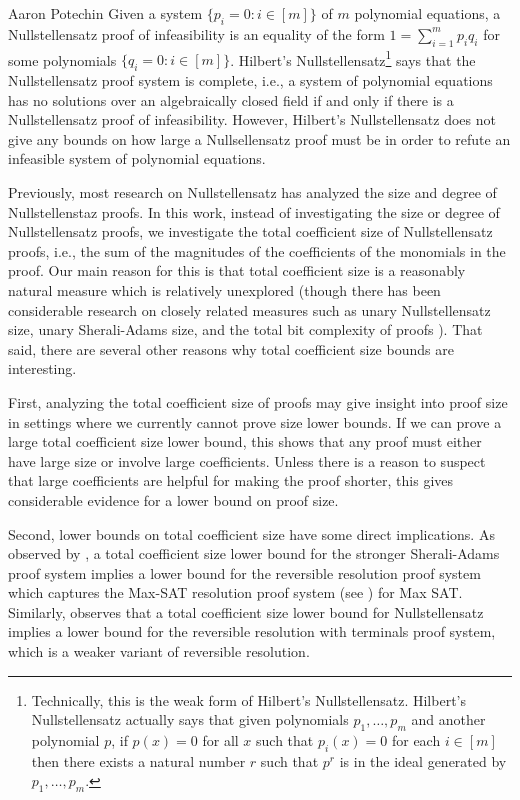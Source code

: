 \documentclass[report]{owrart}
\begin{document}
\begin{report}
\begin{talk}{Aaron Potechin}
    Given a system $\{p_i = 0: i \in [m]\}$ of $m$ polynomial equations, a Nullstellensatz proof of infeasibility is an equality of the form $1 = \sum_{i=1}^{m}{p_i{q_i}}$ for some polynomials $\{q_i = 0: i \in [m]\}$. Hilbert's Nullstellensatz\footnote{Technically, this is the weak form of Hilbert's Nullstellensatz. Hilbert's Nullstellensatz actually says that given polynomials $p_1,\ldots,p_m$ and another polynomial $p$, if $p(x) = 0$ for all $x$ such that $p_i(x) = 0$ for each $i \in [m]$ then there exists a natural number $r$ such that $p^r$ is in the ideal generated by $p_1,\ldots,p_m$. 
} says that the Nullstellensatz proof system is complete, i.e., a system of polynomial equations has no solutions over an algebraically closed field if and only if there is a Nullstellensatz proof of infeasibility. However, Hilbert's Nullstellensatz does not give any bounds on how large a Nullsellensatz proof must be in order to refute an infeasible system of polynomial equations.

Previously, most research on Nullstellensatz has analyzed the size and degree of Nullstellenstaz proofs. In this work, instead of investigating the size or degree of Nullstellensatz proofs, we investigate the total coefficient size of Nullstellensatz proofs, i.e., the sum of the magnitudes of the coefficients of the monomials in the proof. Our main reason for this is that total coefficient size is a reasonably natural measure which is relatively unexplored (though there has been considerable research on closely related measures such as unary Nullstellensatz size, 
unary Sherali-Adams size, and the total bit complexity of proofs \cite{10.4230/LIPIcs.CCC.2021.21, 10.1145/3357713.3384245, 10.1145/3531130.3533344, 9996792, 10353221}). 
That said, there are several other reasons why total coefficient size bounds are interesting. 

First, analyzing the total coefficient size of proofs may give insight into proof size in settings where we currently cannot prove size lower bounds. If we can prove a large total coefficient size lower bound, this shows that any proof must either have large size or involve large coefficients. Unless there is a reason to suspect that large coefficients are helpful for making the proof shorter, this gives considerable evidence for a lower bound on proof size. 

Second, lower bounds on total coefficient size have some direct implications. As observed by \cite{9996792}, a total coefficient size lower bound for the stronger Sherali-Adams proof system implies a lower bound for the reversible resolution proof system which captures the Max-SAT resolution proof system (see \cite{BONET2007606}) for Max SAT. Similarly, \cite{9996792} observes that a total coefficient size lower bound for Nullstellensatz implies a lower bound for the reversible resolution with terminals proof system, which is a weaker variant of reversible resolution. 


\end{talk}
\end{report}
\end{document}
